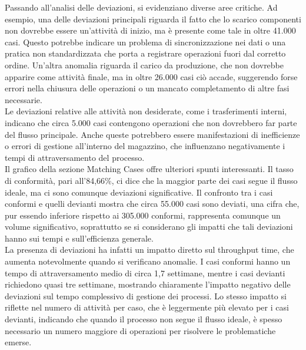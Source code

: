 \documentclass{article}
\begin{document}
Passando all'analisi delle deviazioni, si evidenziano diverse aree critiche. Ad esempio, una delle deviazioni principali riguarda il fatto che lo scarico componenti non dovrebbe essere un'attività di inizio, ma è presente come tale in oltre 41.000 casi. Questo potrebbe indicare un problema di sincronizzazione nei dati o una pratica non standardizzata che porta a registrare operazioni fuori dal corretto ordine. Un'altra anomalia riguarda il carico da produzione, che non dovrebbe apparire come attività finale, ma in oltre 26.000 casi ciò accade, suggerendo forse errori nella chiusura delle operazioni o un mancato completamento di altre fasi necessarie.\\
Le deviazioni relative alle attività non desiderate, come i trasferimenti interni, indicano che circa 5.000 casi contengono operazioni che non dovrebbero far parte del flusso principale. Anche queste potrebbero essere manifestazioni di inefficienze o errori di gestione all'interno del magazzino, che influenzano negativamente i tempi di attraversamento del processo.\\
Il grafico della sezione Matching Cases offre ulteriori spunti interessanti. Il tasso di conformità, pari all'84,66\%, ci dice che la maggior parte dei casi segue il flusso ideale, ma ci sono comunque deviazioni significative. Il confronto tra i casi conformi e quelli devianti mostra che circa 55.000 casi sono deviati, una cifra che, pur essendo inferiore rispetto ai 305.000 conformi, rappresenta comunque un volume significativo, soprattutto se si considerano gli impatti che tali deviazioni hanno sui tempi e sull'efficienza generale.\\
La presenza di deviazioni ha infatti un impatto diretto sul throughput time, che aumenta notevolmente quando si verificano anomalie. I casi conformi hanno un tempo di attraversamento medio di circa 1,7 settimane, mentre i casi devianti richiedono quasi tre settimane, mostrando chiaramente l'impatto negativo delle deviazioni sul tempo complessivo di gestione dei processi. Lo stesso impatto si riflette nel numero di attività per caso, che è leggermente più elevato per i casi devianti, indicando che quando il processo non segue il flusso ideale, è spesso necessario un numero maggiore di operazioni per risolvere le problematiche emerse.
\end{document}

